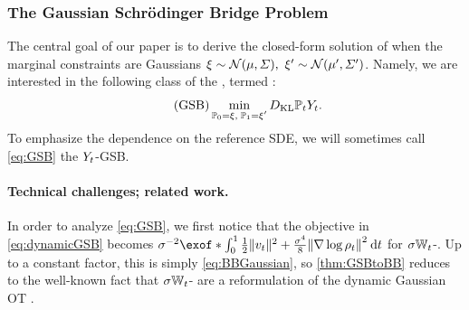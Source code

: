 \subsubsection{The Gaussian Schr\"odinger Bridge Problem}
\label{sec:tere}

The central goal of our paper is to derive the closed-form solution of  when the marginal constraints are Gaussians $\xi \sim \mathcal{N}(\mu, \Sigma),\ \xi' \sim \mathcal{N}(\mu', \Sigma')$. Namely, we are interested in the following class of the , termed :%
\begin{equation}
\label{eq:GSB}
\tag{GSB}
\min_{ \substack{ \Pinit = \xi, \; \Pend = \xi'} } \KL{\Pmargin}{\refsde}.%
\end{equation}
To emphasize the dependence on the reference \acrshort{SDE}, we will sometimes call \eqref{eq:GSB} the $Y_{ t }$-\acrshort{GSB}. 


%


\paragraph{Technical challenges; related work.} In order to analyze \eqref{eq:GSB}, we first notice that the objective in \eqref{eq:dynamicGSB} becomes $\sigma^{-2}\exof*{\int_{0}^\horizon  \frac{1}{2} \norm{\vect}^2 + \frac{\sigma^4}{8} \norm*{\nabla\log\measure}^2 \dt}$ for $\sigma\mathbb{W}_{t}$-. Up to a constant factor, this is simply \eqref{eq:BBGaussian}, so \cref{thm:GSBtoBB} reduces to the well-known fact that $\sigma\mathbb{W}_{t}$- are a reformulation of the dynamic Gaussian \acrshort{OT} \citep{leonard2013survey, chen2016relation, gentil2017analogy}. 

